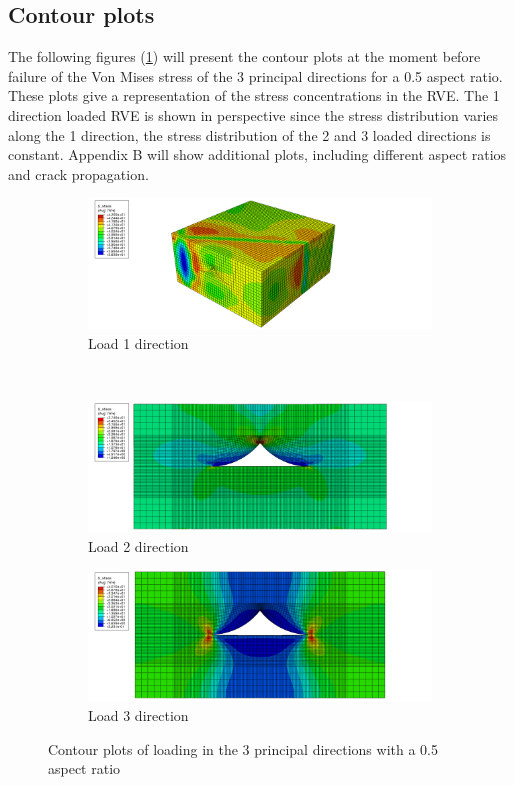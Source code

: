 \subsection{Contour plots }
The following figures (\ref{fig:contour3}) will present the contour plots at the moment before failure of the Von Mises stress of the 3 principal directions for a 0.5 aspect ratio. These plots give a representation of the stress concentrations in the RVE. The 1 direction loaded RVE is shown in perspective since the stress distribution varies along the 1 direction, the stress distribution of the 2 and 3 loaded directions is constant. Appendix B will show additional plots, including different aspect ratios and crack propagation. 

\begin{figure}
\centering
  \begin{subfigure}[b]{0.8\textwidth}
    \includegraphics[width=\textwidth]{chapter_7_non-elasticmodelling/figures/p1_05.png}
    \caption{Load 1 direction}
  \end{subfigure}
  \\
    \begin{subfigure}[b]{0.5\textwidth}
    \includegraphics[width=\textwidth]{chapter_7_non-elasticmodelling/figures/p2_05.png}
    \caption{Load 2 direction}
  \end{subfigure}
    \begin{subfigure}[b]{0.5\textwidth}
    \includegraphics[width=\textwidth]{chapter_7_non-elasticmodelling/figures/p3_05.png}
    \caption{ Load 3 direction}
  \end{subfigure}
  \caption{Contour plots of loading in the 3 principal directions with a 0.5 aspect ratio}
  \label{fig:contour3}
\end{figure}

